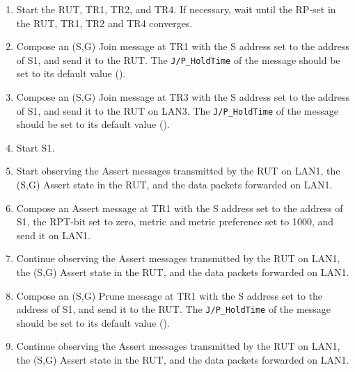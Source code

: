 \documentclass[11pt]{report}
\begin{document}
\begin{enumerate}

  \item Start the RUT, TR1, TR2, and TR4. If necessary, wait until the RP-set
  in the RUT, TR1, TR2 and TR4 converges.

  \item Compose an (S,G) Join message at TR1 with the S address set to the
  address of S1, and send it to the RUT.
  The \verb=J/P_HoldTime= of the message should be set to its default
  value ({\PimsmJPHoldTime}).

  \item Compose an (S,G) Join message at TR3 with the S address set to the
  address of S1, and send it to the RUT on LAN3.
  The \verb=J/P_HoldTime= of the message should be set to its default
  value ({\PimsmJPHoldTime}).

  \item Start S1.

  \item Start observing the Assert messages transmitted by the RUT on
  LAN1, the (S,G) Assert state in the RUT, and the data packets forwarded on
  LAN1. 

  \item Compose an Assert message at TR1 with the S address set to the
  address of S1, the RPT-bit set to zero, metric and metric preference set to
  1000, and send it on LAN1.

  \item Continue observing the Assert messages transmitted by the RUT on
  LAN1, the (S,G) Assert state in the RUT, and the data packets forwarded on
  LAN1.

  \item Compose an (S,G) Prune message at TR1 with the S address set to the
  address of S1, and send it to the RUT.
  The \verb=J/P_HoldTime= of the message should be set to its default
  value ({\PimsmJPHoldTime}).

  \item Continue observing the Assert messages transmitted by the RUT on
  LAN1, the (S,G) Assert state in the RUT, and the data packets forwarded on
  LAN1.

\end{enumerate}

\end{document}
